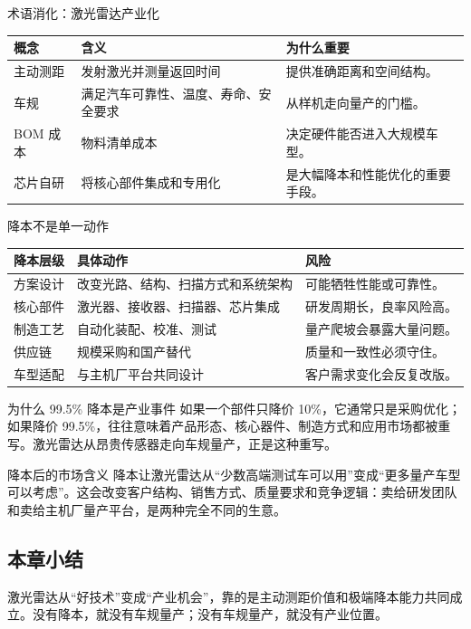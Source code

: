 \begin{knowledgebox}{术语消化：激光雷达产业化}
\begin{tabularx}{\textwidth}{p{}p{}X}
\toprule
概念 & 含义 & 为什么重要 \\
\midrule
主动测距 & 发射激光并测量返回时间 & 提供准确距离和空间结构。 \\
车规 & 满足汽车可靠性、温度、寿命、安全要求 & 从样机走向量产的门槛。 \\
BOM 成本 & 物料清单成本 & 决定硬件能否进入大规模车型。 \\
芯片自研 & 将核心部件集成和专用化 & 是大幅降本和性能优化的重要手段。 \\
\bottomrule
\end{tabularx}
\end{knowledgebox}

\begin{knowledgebox}{降本不是单一动作}
\begin{tabularx}{\textwidth}{p{}p{}X}
\toprule
降本层级 & 具体动作 & 风险 \\
\midrule
方案设计 & 改变光路、结构、扫描方式和系统架构 & 可能牺牲性能或可靠性。 \\
核心部件 & 激光器、接收器、扫描器、芯片集成 & 研发周期长，良率风险高。 \\
制造工艺 & 自动化装配、校准、测试 & 量产爬坡会暴露大量问题。 \\
供应链 & 规模采购和国产替代 & 质量和一致性必须守住。 \\
车型适配 & 与主机厂平台共同设计 & 客户需求变化会反复改版。 \\
\bottomrule
\end{tabularx}
\end{knowledgebox}

\begin{importantbox}{为什么 99.5\% 降本是产业事件}
如果一个部件只降价 10\%，它通常只是采购优化；如果降价 99.5\%，往往意味着产品形态、核心器件、制造方式和应用市场都被重写。激光雷达从昂贵传感器走向车规量产，正是这种重写。
\end{importantbox}

\begin{knowledgebox}{降本后的市场含义}
降本让激光雷达从“少数高端测试车可以用”变成“更多量产车型可以考虑”。这会改变客户结构、销售方式、质量要求和竞争逻辑：卖给研发团队和卖给主机厂量产平台，是两种完全不同的生意。
\end{knowledgebox}

\subsection{本章小结}

激光雷达从“好技术”变成“产业机会”，靠的是主动测距价值和极端降本能力共同成立。没有降本，就没有车规量产；没有车规量产，就没有产业位置。

